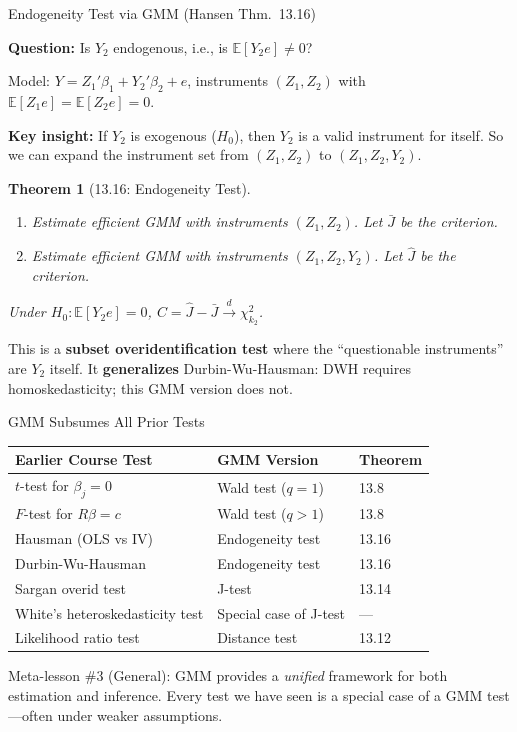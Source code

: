 \documentclass[aspectratio=169, handout]{beamer}
\newtheorem{thm}{Theorem}
\numberwithin{equation}{section}
\begin{document}
\begin{frame}{Endogeneity Test via GMM (Hansen Thm.~13.16)}

\textbf{Question:} Is $Y_2$ endogenous, i.e., is $\mathbb{E}[Y_2 e] \neq 0$?

\smallskip
Model: $Y = Z_1'\beta_1 + Y_2'\beta_2 + e$, \; instruments $(Z_1, Z_2)$ with $\mathbb{E}[Z_1 e]=\mathbb{E}[Z_2 e]=0$.

\smallskip
\textbf{Key insight:} If $Y_2$ is exogenous ($H_0$), then $Y_2$ is a \alert{valid instrument for itself}. So we can expand the instrument set from $(Z_1, Z_2)$ to $(Z_1, Z_2, Y_2)$.

\smallskip
\begin{thm}[13.16: Endogeneity Test]
\begin{enumerate}\itemsep=1pt
\item Estimate efficient GMM with instruments $(Z_1, Z_2)$. Let $\bar J$ be the criterion.
\item Estimate efficient GMM with instruments $(Z_1, Z_2, Y_2)$. Let $\hat J$ be the criterion.
\end{enumerate}
Under $H_0: \mathbb{E}[Y_2 e] = 0$, \; $C = \hat J - \bar J \xrightarrow{d} \chi^2_{k_2}$.
\end{thm}

\smallskip
This is a \textbf{subset overidentification test} where the ``questionable instruments'' are $Y_2$ itself. It \textbf{generalizes} Durbin-Wu-Hausman: DWH requires homoskedasticity; this GMM version does not.

\end{frame}

\begin{frame}{GMM Subsumes All Prior Tests}

\begin{table}[h]
\centering
\small
\begin{tabular}{lll}
\toprule
\textbf{Earlier Course Test} & \textbf{GMM Version} & \textbf{Theorem} \\
\midrule
$t$-test for $\beta_j = 0$ & Wald test ($q = 1$) & 13.8 \\[3pt]
$F$-test for $R\beta = c$ & Wald test ($q > 1$) & 13.8 \\[3pt]
Hausman (OLS vs IV) & Endogeneity test & 13.16 \\[3pt]
Durbin-Wu-Hausman & Endogeneity test & 13.16 \\[3pt]
Sargan overid test & J-test & 13.14 \\[3pt]
White's heteroskedasticity test & Special case of J-test & --- \\[3pt]
Likelihood ratio test & Distance test & 13.12 \\
\bottomrule
\end{tabular}
\end{table}

\smallskip
\alert{Meta-lesson \#3 (General):} GMM provides a \textit{unified} framework for both estimation and inference. Every test we have seen is a special case of a GMM test---often under weaker assumptions.

\end{frame}
\end{document}
